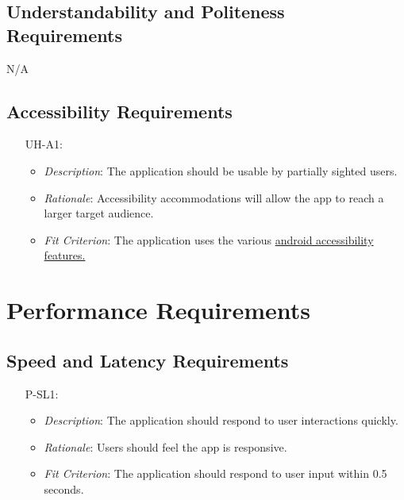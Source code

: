 \documentclass[12pt]{article}
\begin{document}
\subsection{Understandability and Politeness Requirements}

N/A

\subsection{Accessibility Requirements}
\noindent \begin{itemize}
    \item[UH-A1:] 
        \begin{itemize}
            \item \textit{Description}: The application should be usable by partially sighted users.
            \item \textit{Rationale}: Accessibility accommodations will allow the app to reach a larger target audience.
            \item \textit{Fit Criterion}: The application uses the various \href{https://support.google.com/accessibility/android/answer/6006564?hl=en}{android accessibility features.}
        \end{itemize}
\end{itemize}

\section{Performance Requirements}
\subsection{Speed and Latency Requirements}
\noindent \begin{itemize}
    \item[P-SL1:] 
        \begin{itemize}
            \item \textit{Description}: The application should respond to user interactions quickly.
            \item \textit{Rationale}: Users should feel the app is responsive.
            \item \textit{Fit Criterion}: The application should respond to user input within 0.5 seconds.
        \end{itemize}
\end{itemize}
\end{document}
